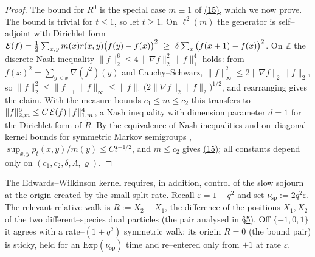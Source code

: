 \documentclass[11pt]{article}
\theoremstyle{plain}
\theoremstyle{definition}
\theoremstyle{remark}
\newcommand{\Z}{\mathbb{Z}}\newcommand{\R}{\mathbb{R}}\newcommand{\N}{\mathbb{N}}
\newcommand{\eps}{\varepsilon}\newcommand{\Exp}{\mathrm{Exp}}
\begin{document}
\begin{proof}
The bound for $R^0$ is the special case $m\equiv1$ of \hyperref[eq_tildeR]{(15)}, which we now
prove. The bound is trivial for $t\le1$, so let $t\ge1$. On $\ell^2(m)$
the generator is self--adjoint with Dirichlet form
$\mathcal E(f)=\tfrac12\sum_{x,y}m(x)r(x,y)\big(f(y)-f(x)\big)^2
\ \ge\ \delta\sum_x\big(f(x+1)-f(x)\big)^2$. On $\Z$ the discrete Nash inequality
$\|f\|_2^6\le4\,\|\nabla f\|_2^2\,\|f\|_1^4$ holds: from
$f(x)^2=\sum_{y<x}\nabla(f^2)(y)$ and Cauchy--Schwarz,
$\|f\|_\infty^2\le2\|\nabla f\|_2\|f\|_2$, so
$\|f\|_2^2\le\|f\|_1\|f\|_\infty\le\|f\|_1\big(2\|\nabla f\|_2\|f\|_2\big)^{1/2}$,
and rearranging gives the claim. With the measure bounds $c_1\le m\le c_2$ this
transfers to $\|f\|_{2,m}^6\le C\,\mathcal E(f)\,\|f\|_{1,m}^4$, a Nash inequality with
dimension parameter $d=1$ for the Dirichlet form of $\widetilde R$. By the
equivalence of Nash inequalities and on--diagonal kernel bounds for symmetric Markov
semigroups \cite{CKS}, $\sup_{x,y}p_t(x,y)/m(y)\le Ct^{-1/2}$, and $m\le c_2$ gives
\hyperref[eq_tildeR]{(15)}; all constants depend only on $(c_1,c_2,\delta,\Lambda,\varrho)$.
\end{proof}

The Edwards--Wilkinson kernel requires, in addition, control of the slow sojourn at the
origin created by the small split rate. Recall $\eps=1-q^2$ and set
$\nu_{\mathrm{sp}}:=2q^2\eps$. The relevant relative walk is $R:=X_2-X_1$, the
difference of the positions $X_1,X_2$ of the two different--species dual particles (the
pair analysed in \S\hyperref[sec_kernel]{5}). Off $\{-1,0,1\}$ it agrees with a rate--$(1+q^2)$
symmetric walk; its origin $R=0$ (the bound pair) is sticky, held for an
$\Exp(\nu_{\mathrm{sp}})$ time and re--entered only from $\pm1$ at rate $\eps$.
\end{document}
